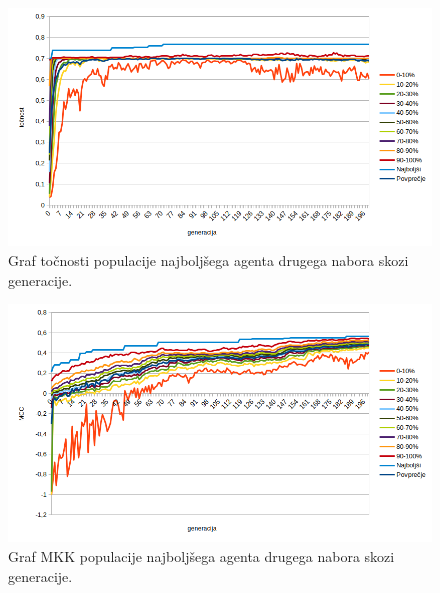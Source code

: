 \begin{figure}[H]
    \begin{center}
        \includegraphics[width=13cm]{car/2/acc}
    \end{center}
    \caption{Graf točnosti populacije najboljšega agenta drugega nabora skozi generacije.}
    \label{fig:car_acc_2}
\end{figure}

\begin{figure}[H]
    \begin{center}
        \includegraphics[width=13cm]{car/2/mcc}
    \end{center}
    \caption{Graf MKK populacije najboljšega agenta drugega nabora skozi generacije.}
    \label{fig:car_mcc_2}
\end{figure}

